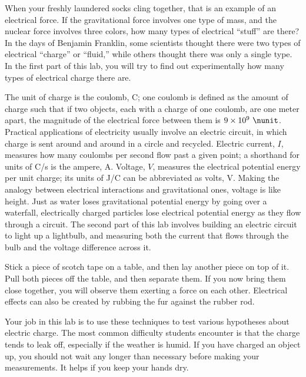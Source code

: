 \vfill

When your freshly laundered socks cling together, that is an
example of an electrical force. If the gravitational force
involves one type of mass, and the nuclear force involves
three colors, how many types of electrical ``stuff'' are
there? In the days of Benjamin Franklin, some scientists
thought there were two types of electrical ``charge'' or
``fluid,'' while others thought there was only a single
type. In the first part of this lab, you will try to find out experimentally
how many types of electrical charge there are.

\vfill

\enlargethispage{-1\baselineskip}

The unit of charge is the coulomb, C; one coulomb is defined as the
amount of charge such that if two objects, each with a charge of
one coulomb, are one meter apart, the magnitude of the electrical
force between them is $9\times10^9\ \nunit$.
Practical applications of electricity usually involve an electric
circuit, in which charge is sent around and around in a circle and
recycled. Electric current, $I$, measures how many coulombs per second flow
past a given point; a shorthand for units of C/s is the ampere, A.
Voltage, $V$, measures the electrical potential energy per unit charge;
its units of J/C can be abbreviated as volts, V. Making the analogy between
electrical interactions and gravitational ones, voltage is like height.
Just as water loses gravitational potential energy by going over a waterfall,
electrically charged particles lose electrical potential energy as they flow
through a circuit. The second part of this lab involves building an
electric circuit to light up a lightbulb, and measuring both the current that
flows through the bulb and the voltage difference across it.



Stick a piece of scotch tape on a table, and then lay
another piece on top of it. Pull both pieces off the table,
and then separate them. If you now bring them close
together, you will observe them exerting a force on each
other. Electrical effects can also be created by rubbing the
fur against the rubber rod.

Your job in this lab is to use these techniques to test
various hypotheses about electric charge. The most common
difficulty students encounter is that the charge tends to
leak off, especially if the weather is humid. If you have
charged an object up, you should not wait any longer than
necessary before making your measurements. It helps if you
keep your hands dry.

